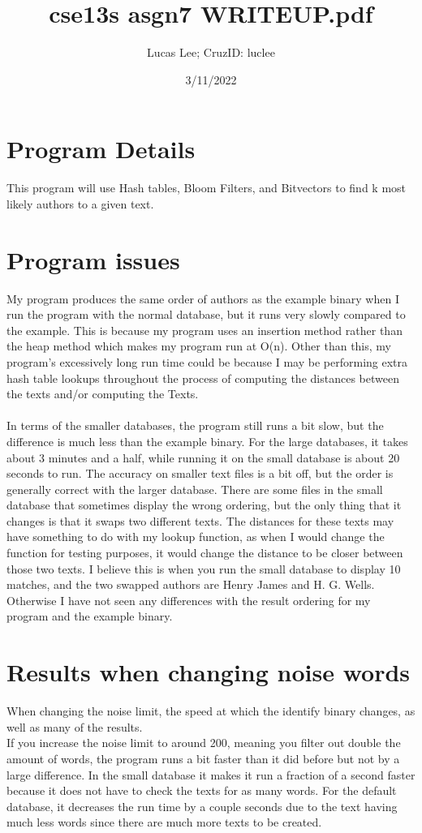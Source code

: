 \documentclass[11pt]{article}
\title{cse13s asgn7 WRITEUP.pdf}
\author{Lucas Lee; CruzID: luclee}
\date{3/11/2022}
\begin{document}
\maketitle

\section{Program Details}\label{ss:details}
This program will use Hash tables, Bloom Filters, and Bitvectors to find k most likely authors to a given text.

\section{Program issues}\label{ss:issues}
My program produces the same order of authors as the example binary when I run the program with the normal database, but it runs very slowly compared to the example. This is because my program uses an insertion method rather than the heap method which makes my program run at O(n). Other than this, my program's excessively long run time could be because I may be performing extra hash table lookups throughout the process of computing the distances between the texts and/or computing the Texts. \\
\\
In terms of the smaller databases, the program still runs a bit slow, but the difference is much less than the example binary. For the large databases, it takes about 3 minutes and a half, while running it on the small database is about 20 seconds to run. The accuracy on smaller text files is a bit off, but the order is generally correct with the larger database. There are some files in the small database that sometimes display the wrong ordering, but the only thing that it changes is that it swaps two different texts. The distances for these texts may have something to do with my lookup function, as when I would change the function for testing purposes, it would change the distance to be closer between those two texts. I believe this is when you run the small database to display 10 matches, and the two swapped authors are Henry James and H. G. Wells. Otherwise I have not seen any differences with the result ordering for my program and the example binary.
\section{Results when changing noise words}\label{ss:noise}
When changing the noise limit, the speed at which the identify binary changes, as well as many of the results.\\
If you increase the noise limit to around 200, meaning you filter out double the amount of words, the program runs a bit faster than it did before but not by a large difference. In the small database it makes it run a fraction of a second faster because it does not have to check the texts for as many words. For the default database, it decreases the run time by a couple seconds due to the text having much less words since there are much more texts to be created. \\
\end{document}
